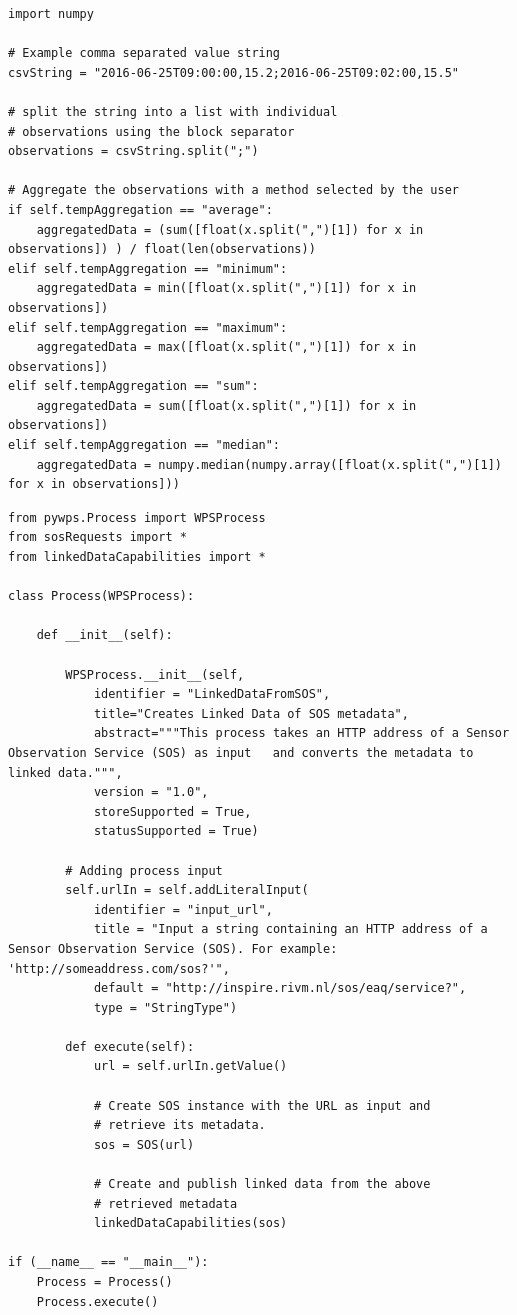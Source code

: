 \begin{lstlisting}[float,caption={Script that performs basic temporal aggregation methods on a comma separated value string}, label={lst:aggregate}]
import numpy

# Example comma separated value string 
csvString = "2016-06-25T09:00:00,15.2;2016-06-25T09:02:00,15.5"

# split the string into a list with individual 
# observations using the block separator 
observations = csvString.split(";")

# Aggregate the observations with a method selected by the user
if self.tempAggregation == "average":
	aggregatedData = (sum([float(x.split(",")[1]) for x in observations]) ) / float(len(observations))
elif self.tempAggregation == "minimum":
	aggregatedData = min([float(x.split(",")[1]) for x in observations])
elif self.tempAggregation == "maximum":
	aggregatedData = max([float(x.split(",")[1]) for x in observations])
elif self.tempAggregation == "sum":
	aggregatedData = sum([float(x.split(",")[1]) for x in observations])
elif self.tempAggregation == "median":
	aggregatedData = numpy.median(numpy.array([float(x.split(",")[1]) for x in observations]))
\end{lstlisting}


\begin{lstlisting}[float,caption={Script that defines a web proces using PyWPS}, label={lst:PyWPS}]
from pywps.Process import WPSProcess
from sosRequests import *
from linkedDataCapabilities import *

class Process(WPSProcess):

	def __init__(self):

		WPSProcess.__init__(self,
			identifier = "LinkedDataFromSOS",
			title="Creates Linked Data of SOS metadata",
			abstract="""This process takes an HTTP address of a Sensor Observation Service (SOS) as input 	and converts the metadata to linked data.""",
			version = "1.0",
			storeSupported = True,
			statusSupported = True)

		# Adding process input
		self.urlIn = self.addLiteralInput(
			identifier = "input_url", 
			title = "Input a string containing an HTTP address of a Sensor Observation Service (SOS). For example: 'http://someaddress.com/sos?'", 
			default = "http://inspire.rivm.nl/sos/eaq/service?", 
			type = "StringType")

		def execute(self):
			url = self.urlIn.getValue()

			# Create SOS instance with the URL as input and 
			# retrieve its metadata.  
			sos = SOS(url)

			# Create and publish linked data from the above 
			# retrieved metadata
			linkedDataCapabilities(sos)

if (__name__ == "__main__"):
	Process = Process()
	Process.execute()
\end{lstlisting}

